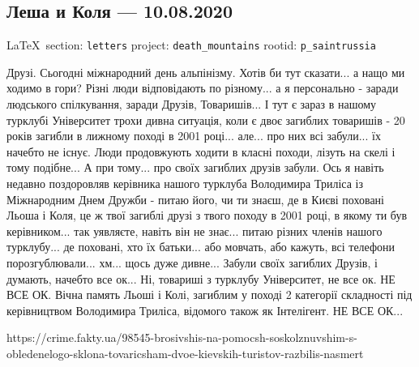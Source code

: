  
 
\subsection{Леша и Коля --- 10.08.2020}
  
\vspace{0.5cm}
 {\ifDEBUG\small\LaTeX~section: \verb|letters| project: \verb|death_mountains| rootid: \verb|p_saintrussia| \fi}
\vspace{0.5cm}

Друзі. Сьогодні міжнародний день альпінізму. Хотів би тут сказати... а нащо ми
ходимо в гори? Різні люди відповідають по різному... а я персонально - заради
людського спілкування, заради Друзів, Товаришів... І тут є зараз в нашому
турклубі Університет трохи дивна ситуація, коли є двоє загиблих товаришів - 20
років загибли в лижному поході в 2001 році... але... про них всі забули... їх
начебто не існує. Люди продовжують ходити в класні походи, лізуть на скелі і
тому подібне... А при тому... про своїх загиблих друзів забули. Ось я навіть
недавно поздоровляв керівника нашого турклуба Володимира Триліса із Міжнародним
Днем Дружби - питаю його, чи ти знаєш, де в Києві поховані Льоша і Коля, це ж
твої загиблі друзі з твого походу в 2001 році, в якому ти був керівником... так
уявляєте, навіть він не знає... питаю різних членів нашого турклубу... де
поховані, хто їх батьки... або мовчать, або кажуть, всі телефони
порозгублювали... хм... щось дуже дивне... Забули своїх загиблих Друзів, і
думають, начебто все ок... Ні, товариші з турклубу Університет, не все ок. НЕ
ВСЕ ОК. Вічна память Льоші і Колі, загиблим у поході 2 категорії складності під
керівництвом Володимира Триліса, відомого також як Інтелігент. НЕ ВСЕ ОК...

https://crime.fakty.ua/98545-brosivshis-na-pomocsh-soskolznuvshim-s-obledenelogo-sklona-tovaricsham-dvoe-kievskih-turistov-razbilis-nasmert
  
